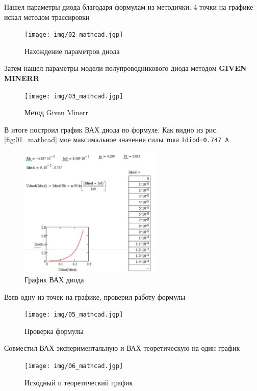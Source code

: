\noindent Нашел параметры диода благодаря формулам из методички. 4 точки на графике искал методом трассировки 
\begin{figure}[H]
	\centering
	\texttt{[image: img/02\_mathcad.jgp]}
	\captionsetup{font=footnotesize}
	\caption{Нахождение параметров диода}
	\label{fig:02_mathcad}
\end{figure}

\newpage
\noindent Затем нашел параметры модели полупроводникового диода методом \textbf{GIVEN MINERR}
\begin{figure}[H]
	\centering
	\texttt{[image: img/03\_mathcad.jgp]}
	\captionsetup{font=footnotesize}
	\caption{Метод Given Minerr}
	\label{fig:03_mathcad}
\end{figure}
\noindent В итоге построил график ВАХ диода по формуле. Как видно из рис.\ref{fig:01_mathcad} мое максимальное значение силы тока \texttt{Idiod=0.747 А}
\begin{figure}[H]
	\centering
	\includegraphics[width=0.6\textwidth]{img/04_mathcad.jpg}
	\captionsetup{font=footnotesize}
	\caption{График ВАХ диода}
	\label{fig:04_mathcad}
\end{figure}

\noindent Взяв одну из точек на графике, проверил работу формулы 
\begin{figure}[H]
	\centering
	\texttt{[image: img/05\_mathcad.jgp]}
	\captionsetup{font=footnotesize}
	\caption{Проверка формулы}
	\label{fig:05mathcad}
\end{figure}

\noindent Совместил ВАХ экспериментальную и ВАХ теоретическую на один график
\begin{figure}[H]
	\centering
	\texttt{[image: img/06\_mathcad.jgp]}
	\captionsetup{font=footnotesize}
	\caption{Исходный и теоретический график}
	\label{fig:06mathcad}
\end{figure}
